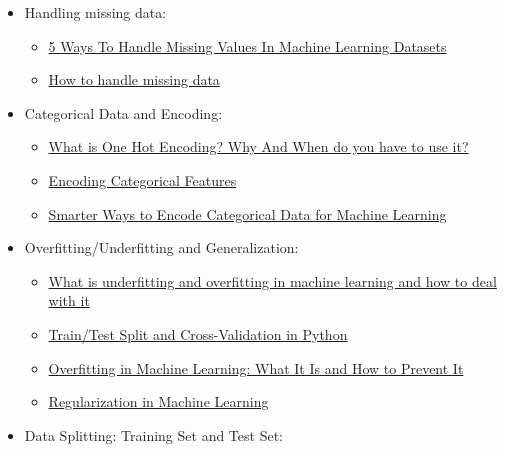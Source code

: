 \documentclass{42-en}
\begin{document}
\begin{itemize}
    \item Handling missing data:
    \begin{itemize}
        \item \href{https://www.analyticsindiamag.com/5-ways-handle-missing-values-machine-learning-datasets/}{5 Ways To Handle Missing Values In Machine Learning Datasets}
        \item \href{https://towardsdatascience.com/how-to-handle-missing-data-8646b18db0d4}{How to handle missing data}
    \end{itemize}
    \item Categorical Data and Encoding:
\begin{itemize}    
        \item \href{https://hackernoon.com/what-is-one-hot-encoding-why-and-when-do-you-have-to-use-it-e3c6186d008f}{What is One Hot Encoding? Why And When do you have to use it?}
        \item \href{https://towardsdatascience.com/encoding-categorical-features-21a2651a065c}{Encoding Categorical Features}
        \item \href{https://towardsdatascience.com/smarter-ways-to-encode-categorical-data-for-machine-learning-part-1-of-3-6dca2f71b159}{Smarter Ways to Encode Categorical Data for Machine Learning}
    \end{itemize}
    \item Overfitting/Underfitting and Generalization:
    \begin{itemize}
        \item \href{https://medium.com/greyatom/what-is-underfitting-and-overfitting-in-machine-learning-and-how-to-deal-with-it-6803a989c76}{What is underfitting and overfitting in machine learning and how to deal with it}
        \item \href{https://towardsdatascience.com/train-test-split-and-cross-validation-in-python-80b61beca4b6}{Train/Test Split and Cross-Validation in Python}
        \item \href{https://elitedatascience.com/overfitting-in-machine-learning}{Overfitting in Machine Learning: What It Is and How to Prevent It}
        \item \href{https://towardsdatascience.com/regularization-in-machine-learning-76441ddcf99a}{Regularization in Machine Learning}
    \end{itemize}
    \item Data Splitting: Training Set and Test Set:
    \begin{itemize}

\end{itemize}
\end{itemize}
\end{document}
